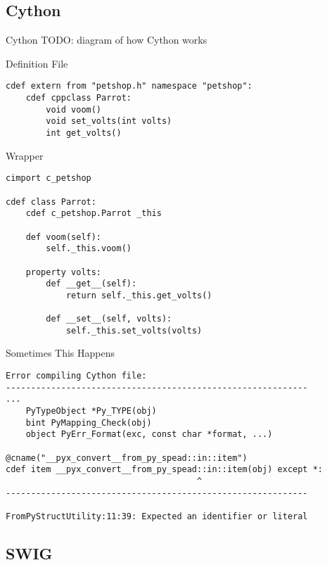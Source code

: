 \documentclass{beamer}
\begin{document}
\subsection{Cython}

\begin{frame}{Cython}
  TODO: diagram of how Cython works
\end{frame}

\begin{frame}[fragile=singleslide]{Definition File}
  \begin{lstlisting}[language=cython]
cdef extern from "petshop.h" namespace "petshop":
    cdef cppclass Parrot:
        void voom()
        void set_volts(int volts)
        int get_volts()
  \end{lstlisting}
\end{frame}

\begin{frame}[fragile=singleslide]{Wrapper}
  \begin{lstlisting}[language=cython]
cimport c_petshop

cdef class Parrot:
    cdef c_petshop.Parrot _this

    def voom(self):
        self._this.voom()

    property volts:
        def __get__(self):
            return self._this.get_volts()

        def __set__(self, volts):
            self._this.set_volts(volts)
  \end{lstlisting}
\end{frame}

\begin{frame}[fragile=singleslide]{Sometimes This Happens}
  \footnotesize
  \begin{verbatim}
Error compiling Cython file:
------------------------------------------------------------
...
    PyTypeObject *Py_TYPE(obj)
    bint PyMapping_Check(obj)
    object PyErr_Format(exc, const char *format, ...)

@cname("__pyx_convert__from_py_spead::in::item")
cdef item __pyx_convert__from_py_spead::in::item(obj) except *:
                                      ^
------------------------------------------------------------

FromPyStructUtility:11:39: Expected an identifier or literal
  \end{verbatim}
\end{frame}

\subsection{SWIG}
\end{document}
